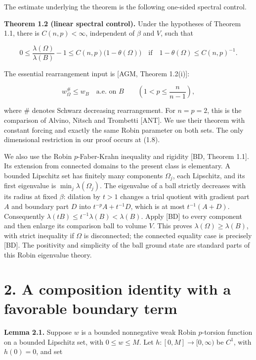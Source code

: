 \documentclass[11pt]{article}
\begin{document}
The estimate underlying the theorem is the following one-sided spectral
control.

\textbf{Theorem 1.2 (linear spectral control).} Under the hypotheses of
Theorem 1.1, there is \(C(n,p)<\infty\), independent of \(\beta\) and
\(V\), such that

\[0\leq\frac{\lambda(\Omega)}{\lambda(B)}-1
\leq C(n,p)\bigl(1-\theta(\Omega)\bigr)
\quad\text{if}\quad
1-\theta(\Omega)\leq C(n,p)^{-1}.\tag{1.7}\]

The essential rearrangement input is {[}AGM, Theorem 1.2(i){]}:

\[w_\Omega^\#\leq w_B\quad\text{a.e. on }B
\qquad\left(1<p\leq\frac n{n-1}\right),\tag{1.8}\]

where \(\#\) denotes Schwarz decreasing rearrangement. For \(n=p=2\),
this is the comparison of Alvino, Nitsch and Trombetti {[}ANT{]}. We use
their theorem with constant forcing and exactly the same Robin parameter
on both sets. The only dimensional restriction in our proof occurs at
(1.8).

We also use the Robin \(p\)-Faber-Krahn inequality and rigidity {[}BD,
Theorem 1.1{]}. Its extension from connected domains to the present
class is elementary. A bounded Lipschitz set has finitely many
components \(\Omega_j\), each Lipschitz, and its first eigenvalue is
\(\min_j\lambda(\Omega_j)\). The eigenvalue of a ball strictly decreases
with its radius at fixed \(\beta\): dilation by \(t>1\) changes a trial
quotient with gradient part \(A\) and boundary part \(D\) into
\(t^{-p}A+t^{-1}D\), which is at most \(t^{-1}(A+D)\). Consequently
\(\lambda(tB)\leq t^{-1}\lambda(B)<\lambda(B)\). Apply {[}BD{]} to every
component and then enlarge its comparison ball to volume \(V\). This
proves \(\lambda(\Omega)\geq\lambda(B)\), with strict inequality if
\(\Omega\) is disconnected; the connected equality case is precisely
{[}BD{]}. The positivity and simplicity of the ball ground state are
standard parts of this Robin eigenvalue theory.

\section{2. A composition identity with a favorable boundary
term}\label{a-composition-identity-with-a-favorable-boundary-term}

\textbf{Lemma 2.1.} Suppose \(w\) is a bounded nonnegative weak Robin
\(p\)-torsion function on a bounded Lipschitz set, with
\(0\leq w\leq M\). Let \(h:[0,M]\to[0,\infty)\) be \(C^1\), with
\(h(0)=0\), and set
\end{document}
